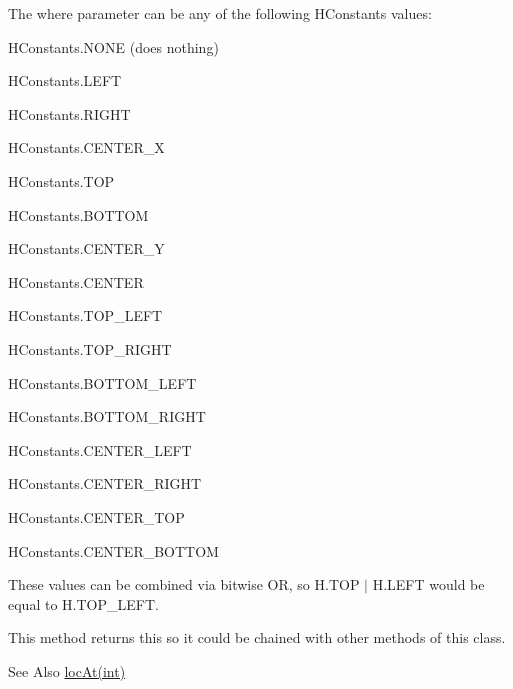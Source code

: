 The {\ttfamily where} parameter can be any of the following H\-Constants values\-:
\begin{DoxyItemize}
\item {\ttfamily H\-Constants.\-N\-O\-N\-E} (does nothing)
\item {\ttfamily H\-Constants.\-L\-E\-F\-T}
\item {\ttfamily H\-Constants.\-R\-I\-G\-H\-T}
\item {\ttfamily H\-Constants.\-C\-E\-N\-T\-E\-R\-\_\-\-X}
\item {\ttfamily H\-Constants.\-T\-O\-P}
\item {\ttfamily H\-Constants.\-B\-O\-T\-T\-O\-M}
\item {\ttfamily H\-Constants.\-C\-E\-N\-T\-E\-R\-\_\-\-Y}
\item {\ttfamily H\-Constants.\-C\-E\-N\-T\-E\-R}
\item {\ttfamily H\-Constants.\-T\-O\-P\-\_\-\-L\-E\-F\-T}
\item {\ttfamily H\-Constants.\-T\-O\-P\-\_\-\-R\-I\-G\-H\-T}
\item {\ttfamily H\-Constants.\-B\-O\-T\-T\-O\-M\-\_\-\-L\-E\-F\-T}
\item {\ttfamily H\-Constants.\-B\-O\-T\-T\-O\-M\-\_\-\-R\-I\-G\-H\-T}
\item {\ttfamily H\-Constants.\-C\-E\-N\-T\-E\-R\-\_\-\-L\-E\-F\-T}
\item {\ttfamily H\-Constants.\-C\-E\-N\-T\-E\-R\-\_\-\-R\-I\-G\-H\-T}
\item {\ttfamily H\-Constants.\-C\-E\-N\-T\-E\-R\-\_\-\-T\-O\-P}
\item {\ttfamily H\-Constants.\-C\-E\-N\-T\-E\-R\-\_\-\-B\-O\-T\-T\-O\-M}
\end{DoxyItemize}

These values can be combined via bitwise O\-R, so {\ttfamily H.\-T\-O\-P $|$ H.\-L\-E\-F\-T} would be equal to {\ttfamily H.\-T\-O\-P\-\_\-\-L\-E\-F\-T}.

This method returns {\ttfamily this} so it could be chained with other methods of this class. \begin{DoxySeeAlso}{See Also}
\hyperlink{classhype_1_1drawable_1_1_h_drawable_a0ca3d835df3317d50723404b777d3a65}{loc\-At(int)} 
\end{DoxySeeAlso}

